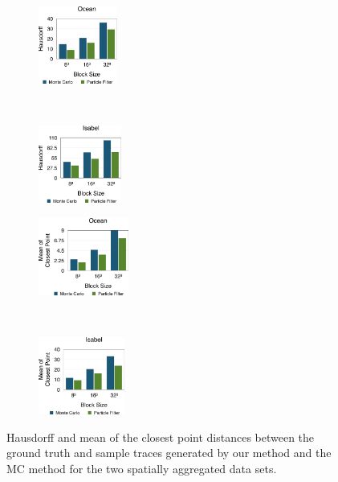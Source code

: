 \begin{figure}[!htb]
  \centering
  \begin{subfigure}[b]{0.24\textwidth}
    \centering
    \includegraphics[height=1.0in]{../figures/ocean_h.eps}
    \caption{}
  \end{subfigure}~
  \begin{subfigure}[b]{0.24\textwidth}
    \centering
    \includegraphics[height=1.0in]{../figures/isabel_h.eps}
    \caption{}
  \end{subfigure}

  \begin{subfigure}[b]{0.24\textwidth}
    \centering
    \includegraphics[height=1.0in]{../figures/ocean_m.eps}
    \caption{}
  \end{subfigure}~
  \begin{subfigure}[b]{0.24\textwidth}
    \centering
    \includegraphics[height=1.0in]{../figures/isabel_m.eps}
    \caption{}
  \end{subfigure}
  \caption{Hausdorff and mean of the closest point distances between the ground truth and sample traces generated by our method and the MC method for the two spatially aggregated data sets.}
  \label{berror_r}
\end{figure}

